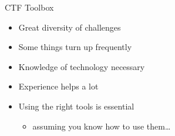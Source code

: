 \begin{frame}
  {CTF Toolbox}

  \begin{itemize}
    \item Great diversity of challenges
    \item Some things turn up frequently
    \item Knowledge of technology necessary
    \item Experience helps a lot
  \end{itemize}

  \begin{itemize}
    \item Using the right tools is essential
      \begin{itemize}
        \item assuming you know how to use them\ldots
      \end{itemize}
  \end{itemize}

\end{frame}



{
\begin{frame}[plain]

\end{frame}}

